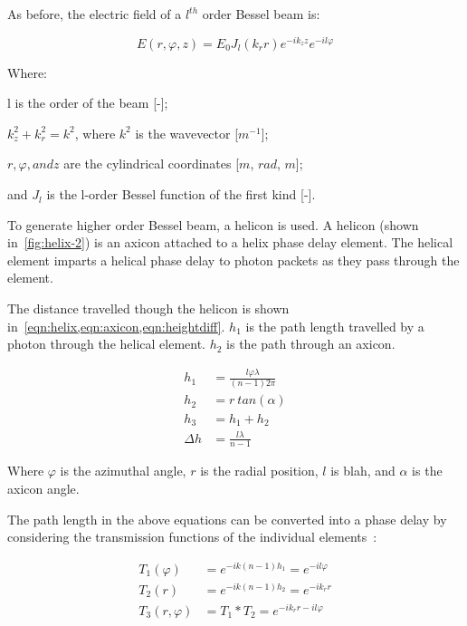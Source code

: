As before, the electric field of a $l^{th}$ order Bessel beam is:

\begin{equation}
E(r,\varphi,z)=E_0J_l(k_r r)e^{-i k_z z}e^{-i l \varphi}
\label{eqn:hobb}
\end{equation}

\noindent Where:

\indent l is the order of the beam [-];

\indent $k_{z}^{2} + k_{r}^{2} =k^2$, where $k^2$ is the wavevector [$m^{-1}$];

\indent $r, \varphi, and z$ are the cylindrical coordinates [$m$, $rad$, $m$];

\indent and $J_l$ is the l-order Bessel function of the first kind [-].

\medskip


To generate higher order Bessel beam, a helicon is used.
A helicon (shown in~\cref{fig:helix-2}) is an axicon attached to a helix phase delay element.
The helical element imparts a helical phase delay to photon packets as they pass through the element.


The distance travelled though the helicon is shown in~\cref{eqn:helix,eqn:axicon,eqn:heightdiff}\cite{wei2015generation}.
$h_1$ is the path length travelled by a photon through the helical element.
$h_2$ is the path through an axicon.

\begin{align}
h_1&=\frac{l\varphi\lambda}{(n-1)2\pi} \label{eqn:helix}\\
h_2&=r\ tan(\alpha)\label{eqn:axicon}\\
h_3&=h_1+h_2 \label{eqn:helicon}\\
\Delta h &= \frac{l\lambda}{n-1}\label{eqn:heightdiff}
\end{align}

Where $\varphi$ is the azimuthal angle, $r$ is the radial position, $l$ is  blah, and $\alpha$ is the axicon angle.

The path length in the above equations can be converted into a phase delay by considering the transmission functions of the individual elements~\cite{khonina1992trochoson,kotlyar2006diffraction,topuzoski2009conversion,qiong2012generalization}:


\begin{align}
T_1(\varphi)&=e^{-ik(n-1)h_1}=e^{-il\varphi}\\
T_2(r)&=e^{-ik(n-1)h_2}=e^{-ik_rr}\\
T_3(r,\varphi)&=T_1*T_2=e^{-ik_rr-il\varphi}\\
\end{align}


